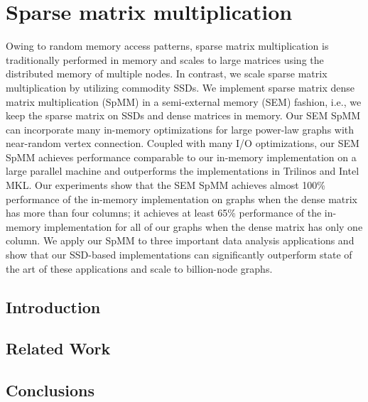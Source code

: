 \chapter{Sparse matrix multiplication}
\label{sec:fe}
\chaptermark{}

Owing to random memory access patterns, sparse matrix multiplication is
traditionally performed in memory and scales to large matrices using
the distributed memory of multiple nodes.
In contrast, we scale sparse matrix multiplication by utilizing commodity
SSDs. We implement sparse matrix dense matrix multiplication (SpMM) in
a semi-external memory (SEM) fashion, i.e., we keep the sparse matrix on SSDs
and dense matrices in memory. Our SEM SpMM can incorporate many
in-memory optimizations for large power-law graphs with near-random vertex
connection. Coupled with many I/O optimizations, our SEM SpMM achieves performance
comparable to our in-memory implementation on a large parallel machine and
outperforms the implementations in Trilinos and Intel MKL.
Our experiments show that the SEM SpMM achieves almost 100\% performance
of the in-memory implementation on graphs when the dense matrix has more
than four columns; it achieves at least 65\% performance of the in-memory
implementation for all of our graphs when the dense matrix has only one column.
We apply our SpMM to three important data analysis applications and show that
our SSD-based implementations can significantly outperform state of the art
of these applications and scale to billion-node graphs.

\section{Introduction}


\section{Related Work}






\section{Conclusions}


